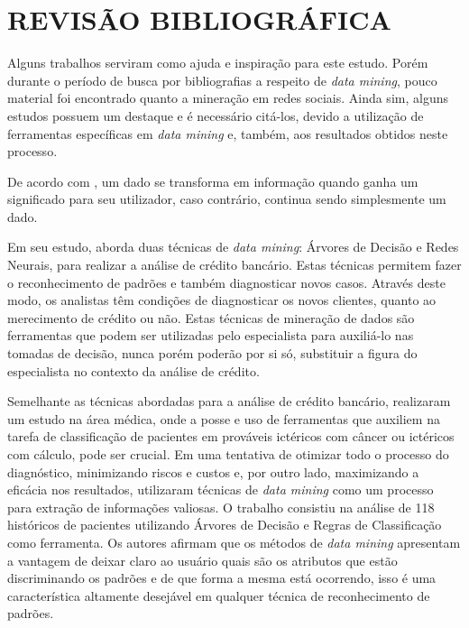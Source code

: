 \chapter{REVISÃO BIBLIOGRÁFICA}\label{ch:rev-bibs}

Alguns trabalhos serviram como ajuda e inspiração para este estudo. Porém durante o período de busca por bibliografias a respeito de \textit{data mining}, pouco material foi encontrado quanto a mineração em redes sociais. Ainda sim, alguns estudos possuem um destaque e é necessário citá-los, devido a utilização de ferramentas específicas em \textit{data mining} e, também, aos resultados obtidos neste processo.

De acordo com , um dado se transforma em informação quando ganha um significado para seu utilizador, caso contrário, continua sendo simplesmente um dado.

Em seu estudo,  aborda duas técnicas de \textit{data mining}: Árvores de Decisão e Redes Neurais, para realizar a análise de crédito bancário. Estas técnicas permitem fazer o reconhecimento de padrões e também diagnosticar novos casos. Através deste modo, os analistas têm condições de diagnosticar os novos clientes, quanto ao merecimento de crédito ou não. Estas técnicas de mineração de dados são ferramentas que podem ser utilizadas pelo especialista para auxiliá-lo nas tomadas de decisão, nunca porém poderão por si só, substituir a figura do especialista no contexto da análise de crédito.

Semelhante as técnicas abordadas para a análise de crédito bancário,  realizaram um estudo na área médica, onde a posse e uso de ferramentas que auxiliem na tarefa de classificação de pacientes em prováveis ictéricos com câncer ou ictéricos com cálculo, pode ser crucial. Em uma tentativa de otimizar todo o processo do diagnóstico, minimizando riscos e custos e, por outro lado, maximizando a eficácia nos resultados, utilizaram técnicas de  \textit{data mining} como um processo para extração de informações valiosas. O trabalho consistiu na análise de 118 históricos de pacientes utilizando Árvores de Decisão e Regras de Classificação como ferramenta. Os autores afirmam que os métodos de \textit{data mining} apresentam a vantagem de deixar claro ao usuário quais são os atributos que estão discriminando os padrões e de que forma a mesma está ocorrendo, isso é uma característica altamente desejável em qualquer técnica de reconhecimento de padrões.

